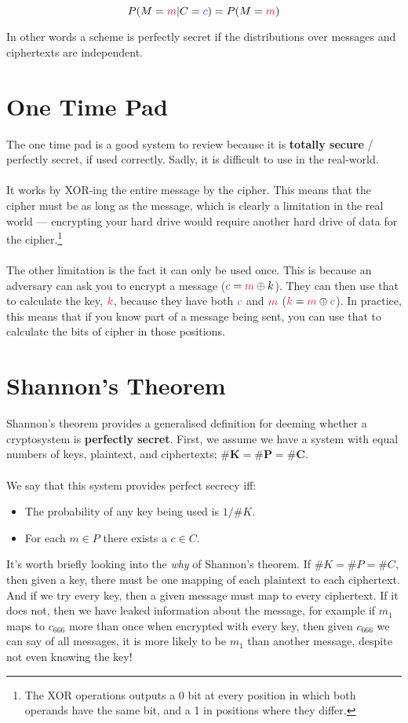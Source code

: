 	$$P(M=\cm|C=\cc)=P(M=\cm)$$

	In other words a scheme is perfectly secret if the distributions over messages and ciphertexts are independent.

\section{One Time Pad}
	The one time pad is a good system to review because it is \textbf{totally secure} / perfectly secret, if used correctly. Sadly, it is difficult to use in the real-world.\\
	\\
	It works by XOR-ing the entire message by the cipher. This means that the cipher must be as long as the message, which is clearly a limitation in the real world --- encrypting your hard drive would require another hard drive of data for the cipher.\footnote{The XOR operations outputs a 0 bit at every position in which both operands have the same bit, and a 1 in positions where they differ.}\\
	\\
	The other limitation is the fact it can only be used once. This is because an adversary  can ask you to encrypt a message ($\cc=\cm\oplus k$). They can then use that to calculate the key, $\ck$,  because they have both $\cc$ and $\cm$ ($\ck=\cm\oplus \cc$). In practice, this means that if you know part of a message being sent, you can use that to calculate the bits of cipher in those positions.

\section{Shannon's Theorem}
	
	Shannon's theorem provides a generalised definition for deeming whether a cryptosystem is \textbf{perfectly secret}. First, we assume we have a system with equal numbers of keys, plaintext, and ciphertexts; $\mathbf{\#K = \#P = \#C}$.\\
	\\
	We say that this system provides perfect secrecy iff:
	\begin{itemize}
		\item The probability of any key being used is $1/\#K$.
		\item For each $m \in P$ there exists a $c \in C$.
	\end{itemize}
	It's worth briefly looking into the \textit{why} of Shannon's theorem. If $\#K = \#P = \#C$, then given a key, there must be one mapping of each plaintext to each ciphertext. And if we try every key, then a given message must map to every ciphertext. If it does not, then we have leaked information about the message, for example if $m_1$ maps to $c_{666}$ more than once when encrypted with every key, then given $c_{666}$ we can say of all messages, it is more likely to be $m_1$ than another message, despite not even knowing the key!